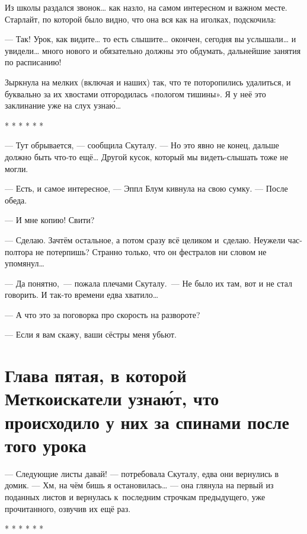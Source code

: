 \documentclass[fontsize=11pt,a5paper,titlepage=firstcover]{scrbook}
\begin{document}
Из школы раздался звонок{\ldots} как назло, на самом интересном и важном месте. Старлайт, по которой было видно, что она вся как на иголках, подскочила:

--- Так! Урок, как видите{\ldots} то есть слышите{\ldots} окончен, сегодня вы услышали{\ldots} и увидели{\ldots} много нового и обязательно должны это обдумать, дальнейшие занятия по расписанию!

Зыркнула на мелких (включая и наших) так, что те поторопились удалиться, и буквально за их хвостами отгородилась «пологом тишины». Я у неё это заклинание уже на слух узнаю́{\ldots}
\begin{center}
	* * * * * *
\end{center}

--- Тут обрывается, --- сообщила Скуталу. --- Но это явно не конец, дальше должно быть что-то ещё{\ldots} Другой кусок, который мы видеть-слышать тоже не могли.

--- Есть, и самое интересное, --- Эппл Блум кивнула на свою сумку. --- После обеда.

--- И мне копию! Свити?

--- Сделаю. Зачтём остальное, а потом сразу всё целиком и~сделаю. Неужели час-полтора не потерпишь? Странно только, что он фестралов ни словом не упомянул{\ldots}

--- Да понятно,~--- пожала плечами Скуталу.~--- Не было их там, вот и не стал говорить. И так-то времени едва хватило{\ldots}

--- А что это за поговорка про скорость на развороте?

--- Ес­ли я вам ска­жу, ва­ши сёс­тры ме­ня убь­ют.




\chapter*{Глава пятая, в которой Меткоискатели узнаю́т, что происходило у них за спинами после того урока}

--- Следующие листы давай! --- потребовала Скуталу, едва они вернулись в домик. --- Хм, на чём бишь я остановилась{\ldots} --- она глянула на первый из поданных листов и вернулась к~последним строчкам предыдущего, уже прочитанного, озвучив их ещё раз.
\begin{center}* * * * * *\end{center}
\end{document}

